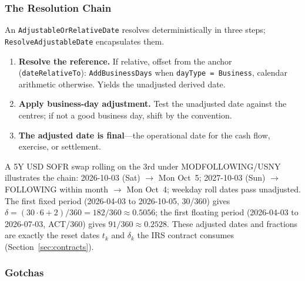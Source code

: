 \subsubsection{The Resolution Chain}
\label{sec:cdm-date-resolution}

An \texttt{AdjustableOrRelativeDate} resolves deterministically in three steps; \texttt{ResolveAdjustableDate} encapsulates them.
\begin{enumerate}[nosep]
\item \textbf{Resolve the reference.} If relative, offset from the anchor (\texttt{date\allowbreak Relative\allowbreak To}): \texttt{Add\allowbreak Business\allowbreak Days} when \texttt{dayType = Business}, calendar arithmetic otherwise. Yields the unadjusted derived date.
\item \textbf{Apply business-day adjustment.} Test the unadjusted date against the centres; if not a good business day, shift by the convention.
\item \textbf{The adjusted date is final}---the operational date for the cash flow, exercise, or settlement.
\end{enumerate}
A 5Y USD SOFR swap rolling on the 3rd under MODFOLLOWING/USNY illustrates the chain: 2026-10-03 (Sat) $\to$ Mon Oct~5; 2027-10-03 (Sun) $\to$ FOLLOWING within month $\to$ Mon Oct~4; weekday roll dates pass unadjusted. The first fixed period (2026-04-03 to 2026-10-05, 30/360) gives $\delta=(30\cdot6+2)/360=182/360\approx0.5056$; the first floating period (2026-04-03 to 2026-07-03, ACT/360) gives $91/360\approx0.2528$. These adjusted dates and fractions are exactly the reset dates $t_k$ and $\delta_k$ the IRS contract consumes (Section~\ref{sec:contracts}).

\subsubsection{Gotchas}
\label{sec:cdm-date-gotchas}

